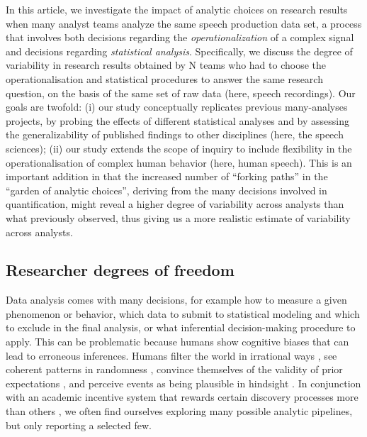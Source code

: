 \documentclass[Review,times,sageh]{sagej}
\begin{document}
In this article, we investigate the impact of analytic choices on research results when many analyst teams analyze the same speech production data set, a process that involves both decisions regarding the \emph{operationalization} of a complex signal and decisions regarding \emph{statistical analysis}.
Specifically, we discuss the degree of variability in research results obtained by N teams who had to choose the operationalisation and statistical procedures to answer the same research question, on the basis of the same set of raw data (here, speech recordings).
Our goals are twofold: (i) our study conceptually replicates previous many-analyses projects, by probing the effects of different statistical analyses and by assessing the generalizability of published findings to other disciplines (here, the speech sciences);
(ii) our study extends the scope of inquiry to include flexibility in the operationalisation of complex human behavior (here, human speech).
This is an important addition in that the increased number of ``forking paths'' in the ``garden of analytic choices'', deriving from the many decisions involved in quantification, might reveal a higher degree of variability across analysts than what previously observed, thus giving us a more realistic estimate of variability across analysts.

\hypertarget{researcher-degrees-of-freedom}{%
\subsection{Researcher degrees of freedom}\label{researcher-degrees-of-freedom}}

Data analysis comes with many decisions, for example how to measure a given phenomenon or behavior, which data to submit to statistical modeling and which to exclude in the final analysis, or what inferential decision-making procedure to apply.
This can be problematic because humans show cognitive biases that can lead to erroneous inferences.
Humans filter the world in irrational ways \citep[e.g.,][]{tversky1974judgment}, see coherent patterns in randomness \citep{brugger2001}, convince themselves of the validity of prior expectations \citep[``I knew it'',][]{nickerson1998confirmation}, and perceive events as being plausible in hindsight \citep[``I knew it all along'',][]{fischhoff1975hindsight}.
In conjunction with an academic incentive system that rewards certain discovery processes more than others \citep{sterling1959publication, koole2012rewarding}, we often find ourselves exploring many possible analytic pipelines, but only reporting a selected few.
\end{document}

